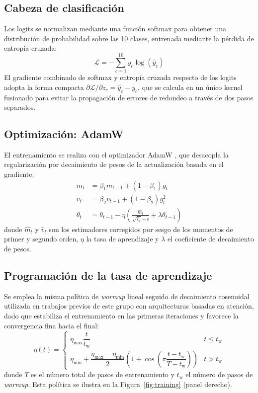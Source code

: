 \documentclass[conference]{IEEEtran}
\begin{document}
\subsection{Cabeza de clasificación}
Los logits se normalizan mediante una función softmax para obtener una distribución de probabilidad sobre las 10 clases, entrenada mediante la pérdida de entropía cruzada:
\begin{equation}
\mathcal{L} = -\sum_{c=1}^{10} y_c \log(\hat{y}_c)
\end{equation}
El gradiente combinado de softmax y entropía cruzada respecto de los logits adopta la forma compacta $\partial\mathcal{L}/\partial z_c = \hat{y}_c - y_c$, que se calcula en un único kernel fusionado para evitar la propagación de errores de redondeo a través de dos pasos separados.

\subsection{Optimización: AdamW}
El entrenamiento se realiza con el optimizador AdamW \cite{loshchilov2017decoupled}, que desacopla la regularización por decaimiento de pesos de la actualización basada en el gradiente:
\begin{align}
m_t &= \beta_1 m_{t-1} + (1-\beta_1)g_t \\
v_t &= \beta_2 v_{t-1} + (1-\beta_2)g_t^2 \\
\theta_t &= \theta_{t-1} - \eta\left(\frac{\hat{m}_t}{\sqrt{\hat{v}_t}+\epsilon} + \lambda\theta_{t-1}\right)
\end{align}
donde $\hat{m}_t$ y $\hat{v}_t$ son los estimadores corregidos por sesgo de los momentos de primer y segundo orden, $\eta$ la tasa de aprendizaje y $\lambda$ el coeficiente de decaimiento de pesos.

\subsection{Programación de la tasa de aprendizaje}
Se emplea la misma política de \emph{warmup} lineal seguido de decaimiento cosenoidal utilizada en trabajos previos de este grupo con arquitecturas basadas en atención, dado que estabiliza el entrenamiento en las primeras iteraciones y favorece la convergencia fina hacia el final:
\begin{equation}
\eta(t) =
\begin{cases}
\eta_{\max}\dfrac{t}{t_{\mathrm{w}}} & t \le t_{\mathrm{w}} \\[8pt]
\eta_{\min} + \dfrac{\eta_{\max}-\eta_{\min}}{2}\left(1+\cos\left(\pi\dfrac{t-t_{\mathrm{w}}}{T-t_{\mathrm{w}}}\right)\right) & t > t_{\mathrm{w}}
\end{cases}
\end{equation}
donde $T$ es el número total de pasos de entrenamiento y $t_{\mathrm{w}}$ el número de pasos de \emph{warmup}. Esta política se ilustra en la Figura~\ref{fig:training} (panel derecho).
\end{document}
